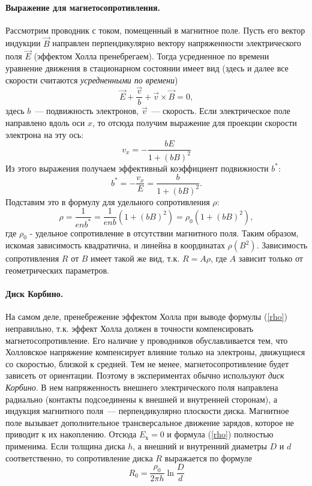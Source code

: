 \documentclass[12pt,a4paper]{article}
\begin{document}
\paragraph{Выражение для магнетосопротивления.} Рассмотрим проводник с током, помещенный в магнитное поле. Пусть его вектор индукции $\vec{B}$ направлен перпендикулярно вектору напряженности электрического поля $\vec{E}$ (эффектом Холла пренебрегаем). Тогда усредненное по времени уравнение движения в стационарном состоянии имеет вид (здесь и далее все скорости считаются \emph{усредненными по времени})
\begin{equation}
\vec{E} + \frac{\vec{v}}{b} + \vec{v}\times\vec{B} = 0\label{eq},
\end{equation}
здесь $b$~--- подвижность электронов, $\vec{v}$~--- скорость. Если электрическое поле направлено вдоль оси $x$, то отсюда получим выражение для проекции скорости электрона на эту ось:
\begin{equation}
v_x = -\frac{bE}{1+\left(bB\right)^2}
\end{equation}
Из этого выражения получаем эффективный коэффициент подвижности $b^*$:
\begin{equation}
b^* = -\frac{v_x}{E} = \frac{b}{1+\left(bB\right)^2}\label{eff}.
\end{equation}
Подставим это в формулу для удельного сопротивления $\rho$:
\begin{equation}
\rho = \frac{1}{enb^*} = \frac{1}{enb}\left(1+\left(bB\right)^2\right) = \rho_0\left(1+\left(bB\right)^2\right)\label{rho}, 
\end{equation}
где $\rho_0$ - удельное сопротивление в отсутствии магнитного поля. Таким образом, искомая зависимость квадратична, и линейна в координатах $\rho\left(B^2\right)$. Зависимость сопротивления $R$ от $B$ имеет такой же вид, т.к. $R = A\rho$, где $A$ зависит только от геометрических параметров.
\paragraph{Диск Корбино.} На самом деле, пренебрежение эффектом Холла при выводе формулы (\ref{rho}) неправильно, т.к. эффект Холла должен в точности компенсировать магнетосопротивление. Его наличие у проводников обуславливается тем, что Холловское напряжение компенсирует влияние только на электроны, движущиеся со скоростью, близкой к средней. Тем не менее, магнетосопротивление будет зависеть от ориентации. Поэтому в экспериментах обычно используют \emph{диск Корбино}. В нем напряженность внешнего электрического поля направлена радиально (контакты подсоединены к внешней и внутренней сторонам), а индукция магнитного поля~--- перпендикулярно плоскости диска. Магнитное поле вызывает дополнительное трансверсальное движение зарядов, которое не приводит к их накоплению. Отсюда $E_\text{х} = 0$ и формула (\ref{rho}) полностью применима. Если толщина диска $h$, а внешний и внутренний диаметры $D$ и $d$ соответственно, то сопротивление диска $R$ выражается по формуле
\begin{equation}
R_0 = \frac{\rho_0}{2\pi h}\ln\frac{D}{d}
\end{equation}
\end{document}
